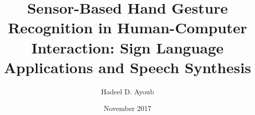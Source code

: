 \documentclass[a4paper,11pt]{report}
\begin{document}
\author{Hadeel D. Ayoub}
\title{
    Sensor-Based Hand Gesture Recognition in Human-Computer Interaction: Sign Language Applications and Speech Synthesis}
\date{November 2017}

\maketitle

\tableofcontents



\printbibliography
\end{document}
